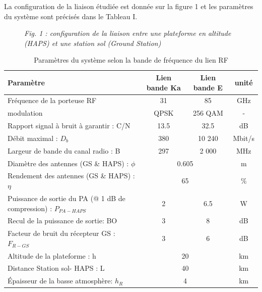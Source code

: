 \documentclass[a4paper,11pt]{article}
\begin{document}
La configuration de la liaison étudiée est donnée sur la figure 1 et les paramètres du système sont précisés dans le Tableau I.

\begin{figure}[h]
    \centering
    \textit{Fig. 1 : configuration de la liaison entre une plateforme en altitude (HAPS) et une station sol (Ground Station)}
\end{figure}

\begin{table}[h]
\centering
\caption{Paramètres du système selon la bande de fréquence du lien RF}
\begin{tabular}{lccc}
\toprule
\textbf{Paramètre} & \textbf{Lien bande Ka} & \textbf{Lien bande E} & \textbf{unité} \\
\midrule
Fréquence de la porteuse RF & 31 & 85 & GHz \\
modulation & QPSK & 256 QAM & - \\
Rapport signal à bruit à garantir : C/N & 13.5 & 32.5 & dB \\
Débit maximal : $D_b$ & 380 & 10 240 & Mbit/s \\
Largeur de bande du canal radio : B & 297 & 2 000 & MHz \\
Diamètre des antennes (GS \& HAPS) : $\phi$ & \multicolumn{2}{c}{0.605} & m \\
Rendement des antennes (GS \& HAPS) : $\eta$ & \multicolumn{2}{c}{65} & \% \\
Puissance de sortie du PA (@ 1 dB de compression) : $P_{PA-HAPS}$ & 2 & 6.5 & W \\
Recul de la puissance de sortie\footnotemark : BO & 3 & 8 & dB \\
Facteur de bruit du récepteur GS : $F_{R-GS}$ & 3 & 6 & dB \\
\midrule
Altitude de la plateforme : h & \multicolumn{2}{c}{20} & km \\
Distance Station sol- HAPS : L & \multicolumn{2}{c}{40} & km \\
Épaisseur de la basse atmosphère\footnotemark : $h_R$ & \multicolumn{2}{c}{4} & km \\
\bottomrule
\end{tabular}
\end{table}


\end{document}
